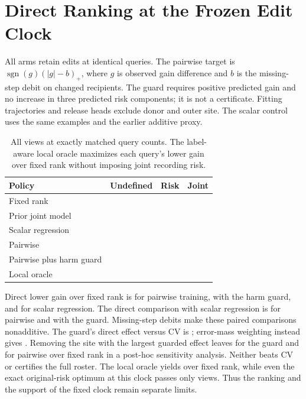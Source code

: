 \section{Direct Ranking at the Frozen Edit Clock}

All arms retain \RankClockEdits{} edits at identical queries.
The pairwise target is $\operatorname{sgn}(g)(|g|-b)_+$,
where $g$ is observed gain difference and $b$ is the
missing-step debit on changed recipients. The guard requires
positive predicted gain and no increase in three predicted
risk components; it is not a certificate. Fitting trajectories
and release heads exclude donor and outer site. The scalar
control uses the same examples and the earlier additive proxy.

\begin{table}[h]
\centering
\caption{All \RankClockViews{} views at exactly matched query counts.
The label-aware local oracle maximizes each query's lower
gain over fixed rank without imposing joint recording risk.}
\small
\begin{tabular}{lrrr}
\toprule
Policy & Undefined & Risk & Joint \\
\midrule
Fixed rank & \RankClockFixedUndefined{} & \RankClockFixedRisk{} & \RankClockFixedJoint{} \\
Prior joint model & \RankClockOldUndefined{} & \RankClockOldRisk{} & \RankClockOldJoint{} \\
Scalar regression & \RankClockRegUndefined{} & \RankClockRegRisk{} & \RankClockRegJoint{} \\
Pairwise & \RankClockPairUndefined{} & \RankClockPairRisk{} & \RankClockPairJoint{} \\
Pairwise plus harm guard & \RankClockHarmUndefined{} & \RankClockHarmRisk{} & \RankClockHarmJoint{} \\
Local oracle & \RankClockLocalUndefined{} & \RankClockLocalRisk{} & \RankClockLocalJoint{} \\
\bottomrule
\end{tabular}
\end{table}

Direct lower gain over fixed rank is \RankClockPaired{} for
pairwise training, \RankClockGuard{} with the harm guard,
and \RankClockScalar{} for scalar regression. The direct
comparison with scalar regression is \RankClockPairScalar{}
for pairwise and \RankClockGuardScalar{} with the guard.
Missing-step debits make these paired comparisons
nonadditive. The guard's direct effect versus CV is
\RankClockCV{}; error-mass weighting instead gives
\RankClockWeightedCV{}. Removing the site with the largest
guarded effect leaves \RankClockGuardWithoutHigh{} for
the guard and \RankClockPairWithoutHigh{} for pairwise
over fixed rank in a post-hoc sensitivity analysis.
Neither beats CV or certifies the full roster. The local
oracle yields \RankClockOracle{} over fixed rank, while
even the exact original-risk optimum at this clock passes
only \SlateQueueClockCapacity{} views. Thus the ranking
and the support of the fixed clock remain separate limits.
